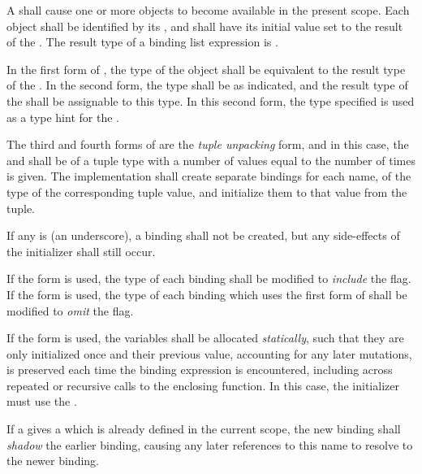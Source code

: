 \specsubsubitem
A  shall cause one or more objects to become
available in the present scope. Each object shall be identified by its
, and shall have its initial value set to the result of the
. The result
type of a binding list expression is .

\specsubsubitem
In the first form of , the type of the object shall
be equivalent to the result type of the . In the
second form, the type shall be as indicated, and the result type of the
 shall be assignable to this type. In this second form,
the type specified is used as a type hint for the .

\specsubsubitem
The third and fourth forms of  are the \textit{tuple
unpacking} form, and in this case, the  and
 shall be of a tuple type with a number of values equal
to the number of times  is given. The implementation shall
create separate bindings for each name, of the type of the corresponding tuple
value, and initialize them to that value from the tuple.

\specsubsubitem
If any  is \terminal{\_} (an underscore), a binding shall not
be created, but any side-effects of the initializer shall still occur.

\specsubsubitem
If the  form is used, the type of each binding shall be
modified to \textit{include} the  flag. If the 
form is used, the type of each binding which uses the first form of
 shall be modified to \textit{omit} the 
flag.

\specsubsubitem
If the  form is used, the variables shall be allocated
\textit{statically}, such that they are only initialized once and their
previous value, accounting for any later mutations, is preserved each time
the binding expression is encountered, including across repeated or recursive
calls to the enclosing function. In this case, the initializer must use the
.

\specsubsubitem
If a  gives a  which is already defined
in the current scope, the new binding shall \textit{shadow} the earlier
binding, causing any later references to this name to resolve to the newer
binding.

